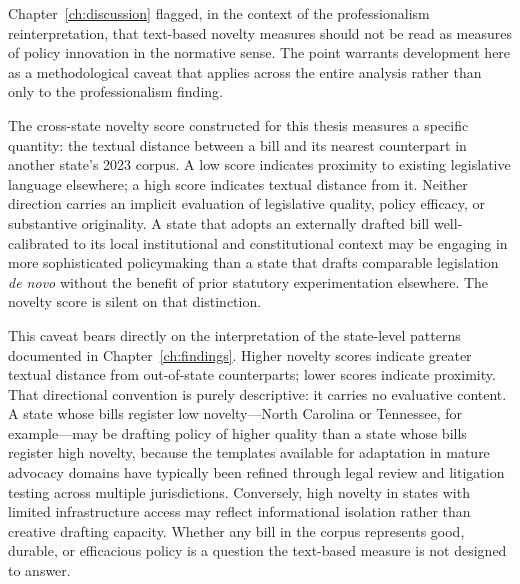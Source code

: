 Chapter~\ref{ch:discussion} flagged, in the context of the professionalism reinterpretation, that text-based novelty measures should not be read as measures of policy innovation in the normative sense. The point warrants development here as a methodological caveat that applies across the entire analysis rather than only to the professionalism finding.

The cross-state novelty score constructed for this thesis measures a specific quantity: the textual distance between a bill and its nearest counterpart in another state's 2023 corpus. A low score indicates proximity to existing legislative language elsewhere; a high score indicates textual distance from it. Neither direction carries an implicit evaluation of legislative quality, policy efficacy, or substantive originality. A state that adopts an externally drafted bill well-calibrated to its local institutional and constitutional context may be engaging in more sophisticated policymaking than a state that drafts comparable legislation \emph{de novo} without the benefit of prior statutory experimentation elsewhere. The novelty score is silent on that distinction.

This caveat bears directly on the interpretation of the state-level patterns documented in Chapter~\ref{ch:findings}. Higher novelty scores indicate greater textual distance from out-of-state counterparts; lower scores indicate proximity. That directional convention is purely descriptive: it carries no evaluative content. A state whose bills register low novelty---North Carolina or Tennessee, for example---may be drafting policy of higher quality than a state whose bills register high novelty, because the templates available for adaptation in mature advocacy domains have typically been refined through legal review and litigation testing across multiple jurisdictions. Conversely, high novelty in states with limited infrastructure access may reflect informational isolation rather than creative drafting capacity. Whether any bill in the corpus represents good, durable, or efficacious policy is a question the text-based measure is not designed to answer.

